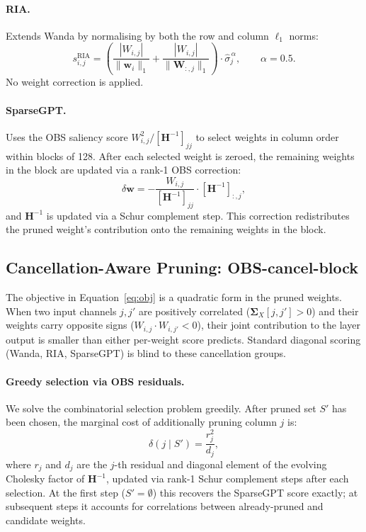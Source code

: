 \documentclass{article}
\begin{document}
\paragraph{RIA.}
Extends Wanda by normalising by both the row and column $\ell_1$ norms:
\begin{equation}
  s^\mathrm{RIA}_{i,j}
  = \left(
      \frac{|W_{i,j}|}{\|\mathbf{w}_i\|_1}
      + \frac{|W_{i,j}|}{\|\mathbf{W}_{:,j}\|_1}
    \right)
    \cdot \hat{\sigma}_j^{\,\alpha},
  \qquad \alpha = 0.5.
\end{equation}
No weight correction is applied.

\paragraph{SparseGPT.}
Uses the OBS saliency score $W_{i,j}^2 / [\mathbf{H}^{-1}]_{jj}$ to select
weights in column order within blocks of 128. After each selected weight is
zeroed, the remaining weights in the block are updated via a rank-1 OBS
correction:
\begin{equation}
  \delta \mathbf{w} = -\frac{W_{i,j}}{[\mathbf{H}^{-1}]_{jj}}
                       \cdot [\mathbf{H}^{-1}]_{:,j},
\end{equation}
and $\mathbf{H}^{-1}$ is updated via a Schur complement step. This correction
redistributes the pruned weight's contribution onto the remaining weights in
the block.


\subsection{Cancellation-Aware Pruning: OBS-cancel-block}
\label{sec:method_ours}

The objective in Equation~\eqref{eq:obj} is a quadratic form in the pruned
weights. When two input channels $j, j'$ are positively correlated
($\boldsymbol{\Sigma}_X[j,j'] > 0$) and their weights carry opposite signs
($W_{i,j} \cdot W_{i,j'} < 0$), their joint contribution to the layer output
is smaller than either per-weight score predicts. Standard diagonal scoring
(Wanda, RIA, SparseGPT) is blind to these cancellation groups.

\paragraph{Greedy selection via OBS residuals.}
We solve the combinatorial selection problem greedily. After pruned set $S'$
has been chosen, the marginal cost of additionally pruning column $j$ is:
\begin{equation}
  \delta(j \mid S') = \frac{r_j^2}{d_j},
\end{equation}
where $r_j$ and $d_j$ are the $j$-th residual and diagonal element of the
evolving Cholesky factor of $\mathbf{H}^{-1}$, updated via rank-1 Schur
complement steps after each selection. At the first step ($S' = \emptyset$)
this recovers the SparseGPT score exactly; at subsequent steps it accounts
for correlations between already-pruned and candidate weights.
\end{document}
